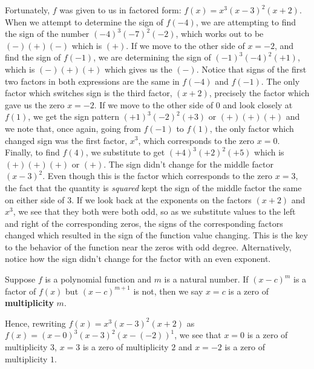Fortunately, $f$ was given to us in factored form:  $f(x) = x^3 (x-3)^2 (x+2)$.  When we attempt to determine the sign of $f(-4)$, we are attempting to find the sign of the number $(-4)^3 (-7)^2 (-2)$, which works out to be $(-)(+)(-)$ which is $(+)$.  If we move to the other side of $x=-2$, and find the sign of $f(-1)$, we are determining the sign of  $(-1)^3 (-4)^2 (+1)$, which is $(-)(+)(+)$ which gives us the $(-)$.  Notice that signs of the first two factors in both expressions are the same in $f(-4)$ and $f(-1)$.  The only factor which switches sign is the third factor, $(x+2)$, precisely the factor which gave us the zero $x=-2$.  If we move to the other side of $0$ and look closely at $f(1)$, we get the sign pattern $(+1)^3(-2)^2(+3)$ or $(+)(+)(+)$ and we note that, once again, going from $f(-1)$ to $f(1)$, the only factor which changed sign was the first factor, $x^3$, which corresponds to the zero $x=0$.  Finally, to find $f(4)$, we substitute to get $(+4)^3(+2)^2(+5)$ which is $(+)(+)(+)$ or $(+)$.  The sign didn't change for the middle factor $(x-3)^2$.  Even though this is the factor which corresponds to the zero $x=3$, the fact that the quantity is \textit{squared} kept the sign of the middle factor the same on either side of $3$.  If we look back at the exponents on the factors $(x+2)$ and $x^3$, we see that they both were both odd, so as we substitute values to the left and right of the corresponding zeros, the signs of the corresponding factors changed which resulted in the sign of the function value changing.  This is the key to the behavior of the function near the zeros with odd degree.  Alternatively, notice how the sign didn't change for the factor with an even exponent.  
\smallskip

\begin{defn} \label{multiplicity} 
Suppose $f$ is a polynomial function and $m$ is a natural number. If $(x-c)^{m}$ is a factor of $f(x)$ but $(x-c)^{m+1}$ is not, then we say $x=c$ is a zero of \textbf{multiplicity} $m$.
\end{defn}

\smallskip

Hence,  rewriting  $f(x) = x^3 (x-3)^2 (x+2)$ as $f(x) = (x-0)^3 (x-3)^2 (x-(-2))^{1}$, we see that $x=0$ is a zero of multiplicity $3$, $x=3$ is a zero of multiplicity $2$ and $x=-2$ is a zero of multiplicity $1$.

\smallskip

